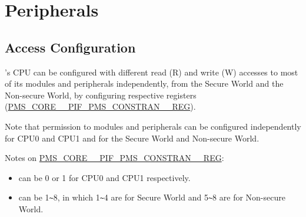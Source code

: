 \documentclass[main\_\_EN.tex]{subfiles}
\begin{document}
\section{Peripherals}
\subsection{Access Configuration}\label{sec:permctrl-peri-address}

\chipname{}'s CPU can be configured with different read (R) and write (W) accesses to most of its modules and peripherals independently, from the Secure World and the Non-secure World, by configuring respective registers (\hyperref[regdesc:PMSCORE0PIFPMSCONSTRAIN1REG]{PMS\_CORE\_\_PIF\_PMS\_CONSTRAN\_\_REG}).

Note that permission to modules and peripherals can be configured independently for CPU0 and CPU1 and for the Secure World and Non-secure World.

Notes on \hyperref[regdesc:PMSCORE0PIFPMSCONSTRAIN1REG]{PMS\_CORE\_\_PIF\_PMS\_CONSTRAN\_\_REG}:
\begin{itemize}
    \item {} can be 0 or 1 for CPU0 and CPU1 respectively.
    \item {} can be 1\verb+~+8, in which 1\verb+~+4 are for Secure World and 5\verb+~+8 are for Non-secure World.
\end{itemize}
\end{document}
